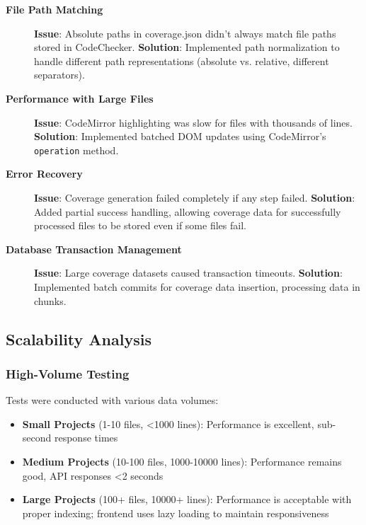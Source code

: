 \begin{description}
    \item[\textbf{File Path Matching}] \textbf{Issue}: Absolute paths in coverage.json didn't always match file paths stored in CodeChecker. \textbf{Solution}: Implemented path normalization to handle different path representations (absolute vs. relative, different separators).
    
    \item[\textbf{Performance with Large Files}] \textbf{Issue}: CodeMirror highlighting was slow for files with thousands of lines. \textbf{Solution}: Implemented batched DOM updates using CodeMirror's \texttt{operation} method.
    
    \item[\textbf{Error Recovery}] \textbf{Issue}: Coverage generation failed completely if any step failed. \textbf{Solution}: Added partial success handling, allowing coverage data for successfully processed files to be stored even if some files fail.
    
    \item[\textbf{Database Transaction Management}] \textbf{Issue}: Large coverage datasets caused transaction timeouts. \textbf{Solution}: Implemented batch commits for coverage data insertion, processing data in chunks.
\end{description}

\subsection{Scalability Analysis}

\subsubsection{High-Volume Testing}

Tests were conducted with various data volumes:

\begin{itemize}
    \item \textbf{Small Projects} (1-10 files, <1000 lines): Performance is excellent, sub-second response times
    \item \textbf{Medium Projects} (10-100 files, 1000-10000 lines): Performance remains good, API responses <2 seconds
    \item \textbf{Large Projects} (100+ files, 10000+ lines): Performance is acceptable with proper indexing; frontend uses lazy loading to maintain responsiveness
\end{itemize}


